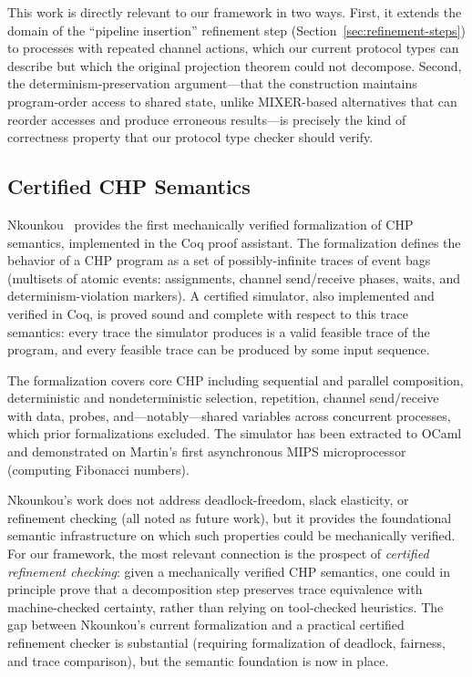 \documentclass[11pt]{article}
\begin{document}
This work is directly relevant to our framework in two ways.  First,
it extends the domain of the ``pipeline insertion'' refinement step
(Section~\ref{sec:refinement-steps}) to processes with repeated
channel actions, which our current protocol types can describe but
which the original projection theorem could not decompose.  Second,
the determinism-preservation argument---that the construction
maintains program-order access to shared state, unlike MIXER-based
alternatives that can reorder accesses and produce erroneous
results---is precisely the kind of correctness property that our
protocol type checker should verify.

\subsection{Certified CHP Semantics}

Nkounkou~\cite{nkounkou2020} provides the first mechanically verified
formalization of CHP semantics, implemented in the Coq proof
assistant.  The formalization defines the behavior of a CHP program as
a set of possibly-infinite traces of event bags (multisets of atomic
events: assignments, channel send/receive phases, waits, and
determinism-violation markers).  A certified simulator, also
implemented and verified in Coq, is proved sound and complete with
respect to this trace semantics: every trace the simulator produces is
a valid feasible trace of the program, and every feasible trace can be
produced by some input sequence.

The formalization covers core CHP including sequential and parallel
composition, deterministic and nondeterministic selection, repetition,
channel send/receive with data, probes, and---notably---shared
variables across concurrent processes, which prior formalizations
excluded.  The simulator has been extracted to OCaml and demonstrated
on Martin's first asynchronous MIPS microprocessor (computing
Fibonacci numbers).

Nkounkou's work does not address deadlock-freedom, slack elasticity,
or refinement checking (all noted as future work), but it provides the
foundational semantic infrastructure on which such properties could be
mechanically verified.  For our framework, the most relevant
connection is the prospect of \emph{certified refinement checking}:
given a mechanically verified CHP semantics, one could in principle
prove that a decomposition step preserves trace equivalence with
machine-checked certainty, rather than relying on tool-checked
heuristics.  The gap between Nkounkou's current formalization and a
practical certified refinement checker is substantial (requiring
formalization of deadlock, fairness, and trace comparison), but the
semantic foundation is now in place.
\end{document}
